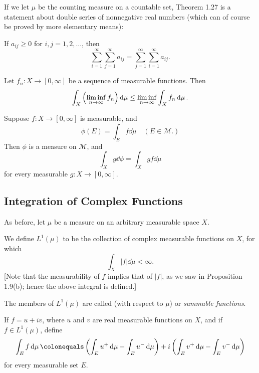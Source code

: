 If we let $\mu$ be the counting measure on a countable set, Theorem 1.27 is a statement about double series of nonnegative real numbers (which can of course be proved by more elementary means): 

\begin{corollary}
If $a_{ij}\ge0$ for $i,j=1,2,\dots$, then
\[\sum_{i=1}^{\infty}\sum_{j=1}^{\infty}a_{ij}=\sum_{j=1}^{\infty}\sum_{i=1}^{\infty}a_{ij}.\]
\end{corollary}

\begin{theorem}
Let $f_n:X\to[0,\infty]$ be a sequence of measurable functions. Then
\begin{equation}
\int_{X}\left(\liminf_{n\to\infty}f_n\right)\dd{\mu}\le\liminf_{n\to\infty}\int_{X}f_n\dd{\mu}.
\end{equation}
\end{theorem}

\begin{proposition}
Suppose $f\colon X\to[0,\infty]$ is measurable, and
\[\phi(E)=\int_{E}f\dd{\mu}\quad(E\in\mathcal{M}.)\]
Then $\phi$ is a measure on $\mathcal{M}$, and
\begin{equation}
\int_{X}g\dd{\phi}=\int_{X}gf\dd{\mu}
\end{equation}
for every measurable $g\colon X\to[0,\infty]$.
\end{proposition}

\subsection{Integration of Complex Functions}
As before, let $\mu$ be a measure on an arbitrary measurable space $X$.

\begin{definition}
We define $L^1(\mu)$ to be the collection of complex measurable functions on $X$, for which
\[\int_{X}|f|\dd{\mu}<\infty.\]
[Note that the measurability of $f$ implies that of $|f|$, as we saw in Proposition 1.9(b); hence the above integral is defined.]

The members of $L^1(\mu)$ are called  (with
respect to $\mu$) or \emph{summable functions}.
\end{definition}

If $f=u+iv$, where $u$ and $v$ are real measurable functions on $X$, and if $f\in L^1(\mu)$, define
\[\int_{E}f\dd{\mu}\colonequals\brac{\int_{E}u^+\dd{\mu}-\int_{E}u^-\dd{\mu}}+i\brac{\int_{E}v^+\dd{\mu}-\int_{E}v^-\dd{\mu}}\]
for every measurable set $E$.

